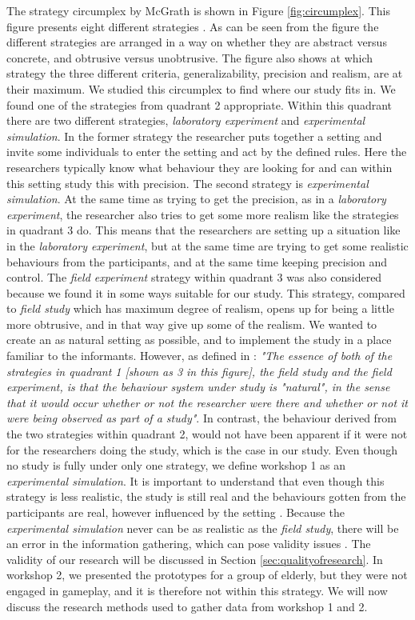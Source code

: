 The strategy circumplex by McGrath is shown in Figure \ref{fig:circumplex}. This figure presents eight different strategies \cite{McGrath}. As can be seen from the figure the different strategies are arranged in a way on whether they are abstract versus concrete, and obtrusive versus unobtrusive. The figure also shows at which strategy the three different criteria, generalizability, precision and realism, are at their maximum. We studied this circumplex to find where our study fits in. We found one of the strategies from quadrant 2 appropriate. Within this quadrant there are two different strategies, \emph{laboratory experiment} and \emph{experimental simulation}. In the former strategy the researcher puts together a setting and invite some individuals to enter the setting and act by the defined rules. Here the researchers typically know what behaviour they are looking for and can within this setting study this with precision. The second strategy is \emph{experimental simulation}. At the same time as trying to get the precision, as in a \emph{laboratory experiment}, the researcher also tries to get some more realism like the strategies in quadrant 3 do. This means that the researchers are setting up a situation like in the \emph{laboratory experiment}, but at the same time are trying to get some realistic behaviours from the participants, and at the same time keeping precision and control. The \emph{field experiment} strategy within quadrant 3 was also considered because we found it in some ways suitable for our study. This strategy, compared to \emph{field study} which has maximum degree of realism, opens up for being a little more obtrusive, and in that way give up some of the realism. We wanted to create an as natural setting as possible, and to implement the study in a place familiar to the informants. However, as defined in \cite{McGrath}: \emph{"The essence of both of the strategies in quadrant 1 [shown as 3 in this figure], the field study and the field experiment, is that the behaviour system under study is "natural", in the sense that it would occur whether or not the researcher were there and whether or not it were being observed as part of a study"}. In contrast, the behaviour derived from the two strategies within quadrant 2, would not have been apparent if it were not for the researchers doing the study, which is the case in our study. Even though no study is fully under only one strategy, we define workshop 1 as an \emph{experimental simulation}. It is important to understand that even though this strategy is less realistic, the study is still real and the behaviours gotten from the participants are real, however influenced by the setting \cite{McGrath}. Because the \emph{experimental simulation} never can be as realistic as the \emph{field study}, there will be an error in the information gathering, which can pose validity issues \cite{alsos}. The validity of our research will be discussed in Section \ref{sec:qualityofresearch}. In workshop 2, we presented the prototypes for a group of elderly, but they were not engaged in gameplay, and it is therefore not within this strategy. We will now discuss the research methods used to gather data from workshop 1 and 2.

